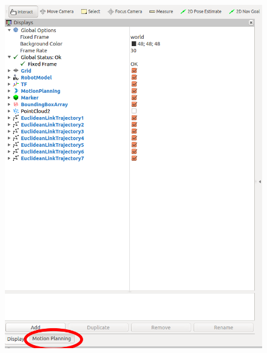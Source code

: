 \begin{figure}
\includegraphics[scale=0.23]{images/motion_planning/gui_moving_procedure_1.png}

\end{figure}
